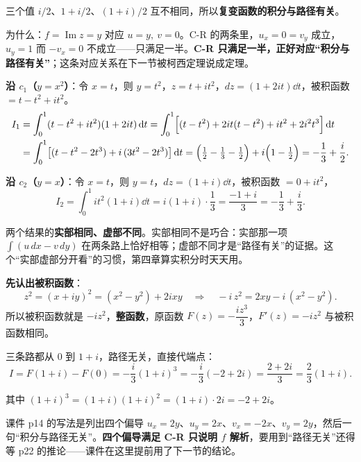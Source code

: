 \documentclass[11pt]{ctexart}
\let\origsubhdr\subhdr
\renewcommand{\subhdr}[1]{\par\needspace{4\baselineskip}\origsubhdr{#1}}
\renewcommand{\qbreak}{\needspace{0.45\textheight}}
\begin{document}
三个值 $i/2$、$1+i/2$、$(1+i)/2$ 互不相同，所以\textbf{复变函数的积分与路径有关}。

为什么：$f=\operatorname{Im}z=y$ 对应 $u=y,\ v=0$。C-R 的两条里，$u_x=0=v_y$ 成立，$u_y=1$ 而 $-v_x=0$ 不成立——只满足一半。\textbf{C-R 只满足一半，正好对应“积分与路径有关”}；这条对应关系在下一节被柯西定理说成定理。

\qbreak
{}


\textbf{沿 $c_1$（$y=x^{2}$）}：令 $x=t$，则 $y=t^{2}$，$z=t+it^{2}$，$dz=(1+2it)\dd t$，被积函数 $=t-t^{2}+it^{2}$。
\begin{align}
I_1&=\int_0^1 (t-t^{2}+it^{2})(1+2it)\,\mathrm{d} t
=\int_0^1\Bigl[(t-t^{2})+2it(t-t^{2})+it^{2}+2i^{2}t^{3}\Bigr]\,\mathrm{d} t\notag\\
&=\int_0^1\bigl[(t-t^{2}-2t^{3})+i\,(3t^{2}-2t^{3})\bigr]\,\mathrm{d} t
=\Bigl(\tfrac12-\tfrac13-\tfrac12\Bigr)+i\Bigl(1-\tfrac12\Bigr)
=-\frac13+\frac{i}{2}.
\end{align}

\textbf{沿 $c_2$（$y=x$）}：令 $x=t$，则 $y=t$，$dz=(1+i)\dd t$，被积函数 $=0+it^{2}$，
\[ I_2=\int_0^1 it^{2}(1+i)\dd t=i(1+i)\cdot\frac13=\frac{-1+i}{3}=-\frac13+\frac{i}{3}. \]

两个结果的\textbf{实部相同、虚部不同}。实部相同不是巧合：实部那一项 $\int(u\,dx-v\,dy)$ 在两条路上恰好相等；虚部不同才是“路径有关”的证据。这个“实部虚部分开看”的习惯，第四章算实积分时天天用。

\qbreak
{}


\textbf{先认出被积函数}：
\[ z^{2}=(x+iy)^{2}=(x^{2}-y^{2})+2ixy
\quad\Longrightarrow\quad -i\,z^{2}=2xy-i\,(x^{2}-y^{2}) . \]
所以被积函数就是 $-i z^{2}$，\textbf{整函数}，原函数 $F(z)=-\dfrac{i z^{3}}{3}$，$F'(z)=-iz^{2}$ 与被积函数相同。

三条路都从 $0$ 到 $1+i$，路径无关，直接代端点：
\[ I=F(1+i)-F(0)=-\frac{i}{3}(1+i)^{3}
=-\frac{i}{3}(-2+2i)=\frac{2+2i}{3}=\frac23(1+i). \]

其中 $(1+i)^{3}=(1+i)(1+i)^{2}=(1+i)\cdot2i=-2+2i$。

课件 p14 的写法是列出四个偏导 $u_x=2y$、$u_y=2x$、$v_x=-2x$、$v_y=2y$，然后一句“积分与路径无关”。\textbf{四个偏导满足 C-R 只说明 $f$ 解析}，要用到“路径无关”还得等 p22 的推论——课件在这里提前用了下一节的结论。
\end{document}
